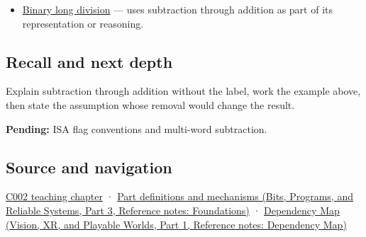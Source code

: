 \hypertarget{appendix-1c7df340573e-used-by}{}

\begin{itemize}
\tightlist
\item
  \hyperref[appendix-89985e6a2685]{Binary long division} --- uses subtraction through addition as part of its representation or reasoning.
\end{itemize}

\subsection{Recall and next depth}\label{appendix-1c7df340573e-recall-and-next-depth}

\hypertarget{appendix-1c7df340573e-recall-and-next-depth}{}

Explain subtraction through addition without the label, work the example above, then state the assumption whose removal would change the result.

\textbf{Pending:} ISA flag conventions and multi-word subtraction.

\subsection{Source and navigation}\label{appendix-1c7df340573e-source-and-navigation}

\hypertarget{appendix-1c7df340573e-source-and-navigation}{}

\hyperref[01-foundations-i-ch001-arithmetic-becomes-a-policy]{C002 teaching chapter} · \href{../01-Bits-Programs-and-Reliable-Systems-P03/main.pdf\#nameddest=appendix-fd090d982a15}{Part definitions and mechanisms (Bits, Programs, and Reliable Systems, Part 3, Reference notes: Foundations)} · \href{../07-Vision-XR-and-Playable-Worlds-P01/main.pdf\#nameddest=appendix-4ad47bdd269a}{Dependency Map (Vision, XR, and Playable Worlds, Part 1, Reference notes: Dependency Map)}
